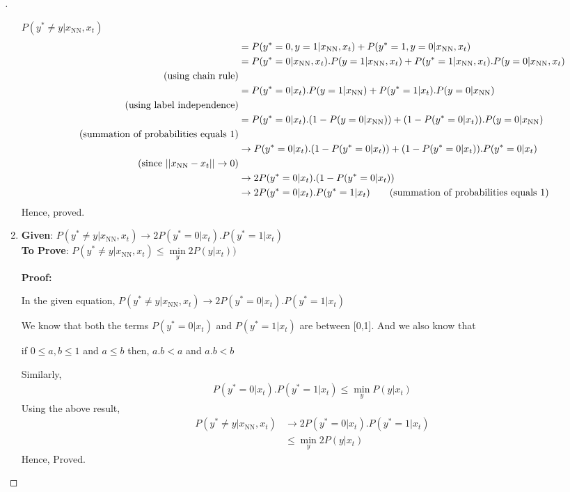 \documentclass[a4paper, 12pt]{article}
\begin{document}
\begin{proof}[]
\begin{enumerate}[label={\color{blue}{\textbf{2.\arabic*})}}]
        $P(y^* \neq y|x_{\text{NN}},x_t) $
        \begin{align*}
            &= P(y^*=0,y=1|x_{\text{NN}},x_t) + P(y^*=1,y=0|x_{\text{NN}},x_t)
            \\
            &= P(y^*=0|x_{\text{NN}},x_t).P(y=1|x_{\text{NN}},x_t) + P(y^*=1|x_{\text{NN}},x_t).P(y=0|x_{\text{NN}},x_t)
            \\
            \tag*{(using chain rule)}\\
            &= P(y^*=0|x_t).P(y=1|x_{\text{NN}}) + P(y^*=1|x_t).P(y=0|x_{\text{NN}})
            \\
            \tag*{(using label independence)}\\
            &= P(y^*=0|x_t).(1 - P(y=0|x_{\text{NN}})) + (1 - P(y^*=0|x_t)).P(y=0|x_{\text{NN}})
            \\
            \tag*{(summation of probabilities equals 1)}\\
            &\to P(y^*=0|x_t).(1 - P(y^*=0|x_t)) + (1 - P(y^*=0|x_t)).P(y^*=0|x_t)
            \\
            \tag*{(since $||x_{\text{NN}} - x_t|| \to 0$)}\\
            &\to 2P(y^*=0|x_t).(1 - P(y^*=0|x_t))
            \\
            &\to 2P(y^*=0|x_t).P(y^*=1|x_t) \tag*{(summation of probabilities equals 1)}
        \end{align*}
        Hence, proved.
        \pagebreak
        
    \item 
        \textbf{Given}: $P(y^* \neq y|x_{\text{NN}},x_t) \to 2P(y^*=0|x_t).P(y^*=1|x_t)$ \\
        \textbf{To Prove}: $P(y^* \neq y|x_{\text{NN}},x_t) \leq  \min\limits_y 2P(y|x_t)) $ 
        \smallskip
        
        \textbf{Proof:}
        
        In the given equation, $P(y^* \neq y|x_{\text{NN}},x_t) \to 2P(y^*=0|x_t).P(y^*=1|x_t)$
        
        We know that both the terms $P(y^*=0|x_t)$ and $P(y^*=1|x_t)$ are between [0,1]. And we also know that 
        
        if $0 \leq a, b \leq 1$ and $a \leq b$ then, $a.b < a$ and $a.b < b$ 
        
        Similarly, 
        \begin{align*}
            P(y^*=0|x_t).P(y^*=1|x_t) \leq \min\limits_y P(y|x_t) \tag*{(eq 1)}
        \end{align*}
        Using the above result,
        \begin{align*}
            P(y^* \neq y|x_{\text{NN}},x_t)  &\to 2P(y^*=0|x_t).P(y^*=1|x_t) \\
            &\leq  \min\limits_y 2P(y|x_t) \tag*{(using result in eq 1)}
        \end{align*}
        Hence, Proved.
        

\end{enumerate}
\end{proof}
\end{document}

